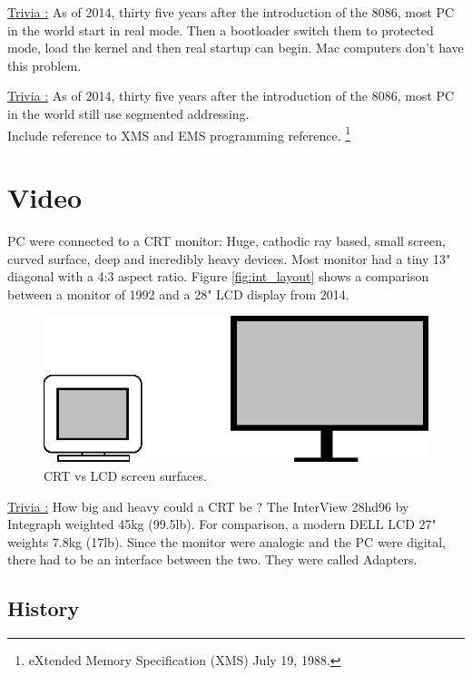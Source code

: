 \documentclass[book.tex]{subfiles}
\begin{document}
{\underline{Trivia :}}  As of 2014, thirty five years after the introduction of the 8086, most PC in the world start in  real mode. Then a bootloader switch them to protected mode, load the kernel and then real startup can begin. Mac computers don't have this problem.

\bigskip

{\underline{Trivia :}}  As of 2014, thirty five years after the introduction of the 8086, most PC in the world still use segmented addressing.\\

Include reference to XMS and EMS programming reference. \footnote{eXtended Memory Specification (XMS) July 19, 1988.}


\section{Video}

PC were connected to a CRT monitor: Huge, cathodic ray based, small screen, curved surface, deep and incredibly heavy devices. Most monitor had a tiny 13" diagonal with a 4:3 aspect ratio. Figure \ref{fig:int_layout} shows a comparison between a monitor of 1992 and a 28" LCD display from 2014.\\

\begin{figure}[H]
\centering
\includegraphics[scale=1.2]{imgs/crt_lcd.eps}
\caption{CRT vs LCD screen surfaces.}
\label{fig:lcd_vs_crt}
\end{figure}

{\underline{Trivia :}} How big and heavy could a CRT be ? The InterView 28hd96 by Integraph weighted 45kg (99.5lb). For comparison, a modern DELL LCD 27" weights 7.8kg (17lb).
\bigskip
Since the monitor were analogic and the PC were digital, there had to be an interface between the two. They were called Adapters.

  \subsection{History}
\end{document}
